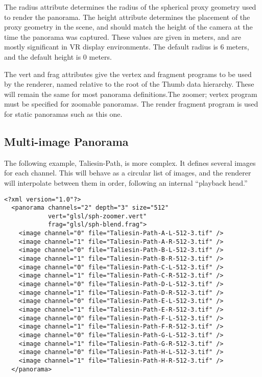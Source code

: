 \documentclass[article,oneside,11pt]{memoir}
\begin{document}
\begin{Spacing}{1.1}
The radius attribute determines the radius of the spherical proxy geometry used to render the panorama. The height attribute determines the placement of the proxy geometry in the scene, and should match the height of the camera at the time the panorama was captured. These values are given in meters, and are mostly significant in VR display environments. The default radius is 6 meters, and the default height is 0 meters.

The vert and frag attributes give the vertex and fragment programs to be used by the renderer, named relative to the root of the Thumb data hierarchy. These will remain the same for most panorama definitions.The zoomer; vertex program must be specified for zoomable panoramas. The render fragment program is used for static panoramas such as this one.

\subsection{Multi-image Panorama}

The following example, Taliesin-Path, is more complex. It defines several images for each channel. This will behave as a circular list of images, and the renderer will interpolate between them in order, following an internal “playback head.”

\begin{verbatim}
<?xml version="1.0"?>
  <panorama channels="2" depth="3" size="512"
            vert="glsl/sph-zoomer.vert"
            frag="glsl/sph-blend.frag">
    <image channel="0" file="Taliesin-Path-A-L-512-3.tif" />
    <image channel="1" file="Taliesin-Path-A-R-512-3.tif" />
    <image channel="0" file="Taliesin-Path-B-L-512-3.tif" />
    <image channel="1" file="Taliesin-Path-B-R-512-3.tif" />
    <image channel="0" file="Taliesin-Path-C-L-512-3.tif" />
    <image channel="1" file="Taliesin-Path-C-R-512-3.tif" />
    <image channel="0" file="Taliesin-Path-D-L-512-3.tif" />
    <image channel="1" file="Taliesin-Path-D-R-512-3.tif" />
    <image channel="0" file="Taliesin-Path-E-L-512-3.tif" />
    <image channel="1" file="Taliesin-Path-E-R-512-3.tif" />
    <image channel="0" file="Taliesin-Path-F-L-512-3.tif" />
    <image channel="1" file="Taliesin-Path-F-R-512-3.tif" />
    <image channel="0" file="Taliesin-Path-G-L-512-3.tif" />
    <image channel="1" file="Taliesin-Path-G-R-512-3.tif" />
    <image channel="0" file="Taliesin-Path-H-L-512-3.tif" />
    <image channel="1" file="Taliesin-Path-H-R-512-3.tif" />
  </panorama>
\end{verbatim}


\end{Spacing}
\end{document}

